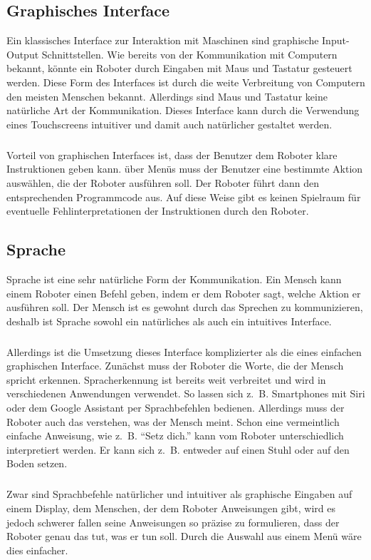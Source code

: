 \subsection{Graphisches Interface}
Ein klassisches Interface zur Interaktion mit Maschinen sind graphische
Input-Output Schnittstellen. Wie bereits von der Kommunikation mit Computern
bekannt, könnte ein Roboter durch Eingaben mit Maus und Tastatur gesteuert
werden. Diese Form des Interfaces ist durch die weite Verbreitung von Computern
den meisten Menschen bekannt. Allerdings sind Maus und Tastatur keine
natürliche Art der Kommunikation. Dieses Interface kann durch die Verwendung
eines Touchscreens intuitiver und damit auch natürlicher gestaltet werden.

\subparagraph{}
Vorteil von graphischen Interfaces ist, dass der Benutzer dem Roboter klare
Instruktionen geben kann. über Menüs muss der Benutzer eine bestimmte Aktion
auswählen, die der Roboter ausführen soll. Der Roboter führt dann den
entsprechenden Programmcode aus. Auf diese Weise gibt es keinen Spielraum für
eventuelle Fehlinterpretationen der Instruktionen durch den Roboter.

\subsection{Sprache}
Sprache ist eine sehr natürliche Form der Kommunikation. Ein Mensch kann einem
Roboter einen Befehl geben, indem er dem Roboter sagt, welche Aktion er
ausführen soll. Der Mensch ist es gewohnt durch das Sprechen zu kommunizieren,
deshalb ist Sprache sowohl ein natürliches als auch ein intuitives Interface.

\subparagraph{}
Allerdings ist die Umsetzung dieses Interface komplizierter als die eines
einfachen graphischen Interface. Zunächst muss der Roboter die Worte, die der
Mensch spricht erkennen. Spracherkennung ist bereits weit verbreitet und wird in
verschiedenen Anwendungen verwendet. So lassen sich z.~B. Smartphones mit Siri
oder dem Google Assistant per Sprachbefehlen bedienen. Allerdings muss der
Roboter auch das verstehen, was der Mensch meint. Schon eine vermeintlich
einfache Anweisung, wie z.~B. "`Setz dich."' kann vom Roboter unterschiedlich
interpretiert werden. Er kann sich z.~B. entweder auf einen Stuhl oder auf den
Boden setzen.

\subparagraph{}
Zwar sind Sprachbefehle natürlicher und intuitiver als graphische Eingaben auf
einem Display, dem Menschen, der dem Roboter Anweisungen gibt, wird es jedoch
schwerer fallen seine Anweisungen so präzise zu formulieren, dass der Roboter
genau das tut, was er tun soll. Durch die Auswahl aus einem Menü wäre dies
einfacher.

